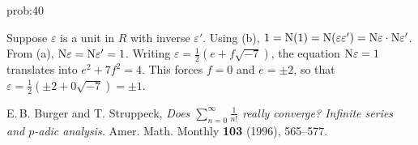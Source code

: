 \begin{sol}{prob:40}
\begin{rmks}
\begin{enumerate}
 Suppose $\varepsilon$ is a unit in $R$ with inverse $\varepsilon'$. Using (b), $1 = \mathrm{N}(1) = \mathrm{N}(\varepsilon \varepsilon') = \mathrm{N}\varepsilon \cdot \mathrm{N}\varepsilon'$. From (a), $\mathrm{N}\varepsilon = \mathrm{N}\varepsilon'=1$. Writing $\varepsilon = \frac{1}{2}(e+f\sqrt{-7})$, the equation $\mathrm{N}\varepsilon=1$ translates into $e^2+7f^2=4$. This forces $f=0$ and $e=\pm 2$, so that $\varepsilon = \frac{1}{2}(\pm 2 + 0\sqrt{-7}) = \pm 1$.

 
\end{enumerate}
\end{rmks}

\end{sol}

\let\oldaddcontentsline\addcontentsline
\renewcommand{\addcontentsline}[3]{}
\begin{thebibliography}{11}
          E.\,B. Burger and T. Struppeck, \emph{Does $\sum_{n=0}^{\infty} \frac{1}{n!}$ really converge? Infinite series and $p$-adic analysis.} Amer. Math. Monthly \textbf{103} (1996), 565--577.
    \end{thebibliography}
\let\addcontentsline\oldaddcontentsline

